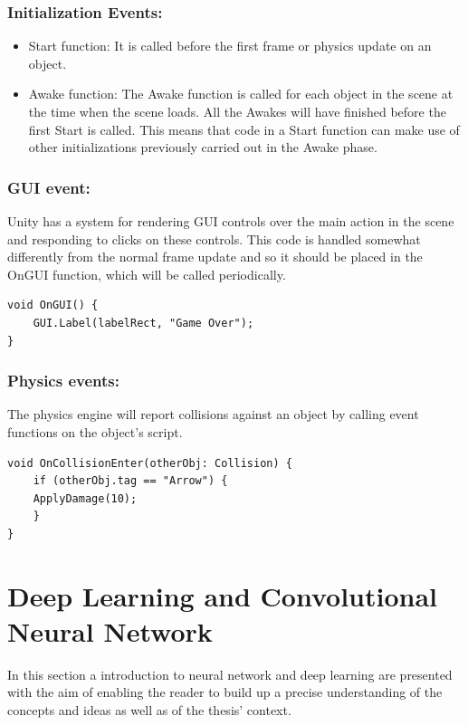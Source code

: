 \subsubsection*{Initialization Events:}
\begin{itemize}
	\item Start function: It is called before the first frame or physics update on an object.
	\item Awake function: The Awake function is called for each object in the scene at the time when the scene loads. All the Awakes will have finished before the first Start is called. This means that code in a Start function can make use of other initializations previously carried out in the Awake phase.
\end{itemize}


\subsubsection*{GUI event:} 
Unity has a system for rendering GUI controls over the main action in the scene and responding to clicks on these controls. This code is handled somewhat differently from the normal frame update and so it should be placed in the OnGUI function, which will be called periodically.

\begin{lstlisting}[caption=GUI  Events Functions]
void OnGUI() {
	GUI.Label(labelRect, "Game Over");
}
\end{lstlisting}


\subsubsection*{Physics events:} 
The physics engine will report collisions against an object by calling event functions on the object's script. 		
\begin{lstlisting}[caption=Physics Events Functions]
void OnCollisionEnter(otherObj: Collision) {
	if (otherObj.tag == "Arrow") {
	ApplyDamage(10);
	}
}
\end{lstlisting}



\section{Deep Learning and Convolutional Neural Network}
In this section a introduction to neural network and deep learning are presented with the aim of enabling the reader to build up a precise understanding of the concepts and ideas as well as of the thesis' context.

